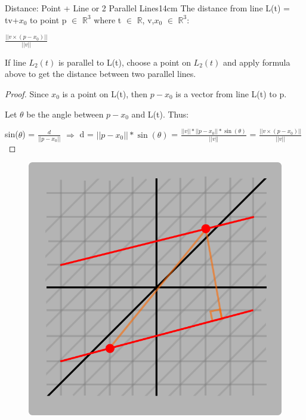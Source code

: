     \newpage



    \begin{wtheorem}{Distance: Point + Line or 2 Parallel Lines}{14cm}
        The distance from line L(t) = tv+$x_0$ to point p $\in$ $\mathbb{R}^3$
        where t $\in$ $\mathbb{R}$, v,$x_0$ $\in$ $\mathbb{R}^3$:

        \hspace{0.5cm}
        $\frac{||v \times (p - x_0)||}{||v||}$

        If line $L_2(t)$ is parallel to L(t), choose a point on $L_2(t)$
        and apply formula above to get the distance between two parallel lines.
    \end{wtheorem}

    \begin{proof}
        Since $x_0$ is a point on L(t), then
        $p - x_0$ is a vector from line L(t) to p.

        Let $\theta$ be the angle between $p - x_0$
        and L(t). Thus:

        \hspace{0.5cm}
        sin($\theta$) = $\frac{d}{||p - x_0||}$
        \hspace{0.5cm}
        $\Rightarrow$
        \hspace{0.5cm}
        d = $||p - x_0|| * \sin(\theta)$
        = $\frac{||v|| * ||p - x_0|| * \sin(\theta)}{||v||}$
        = $\frac{||v \times (p - x_0)||}{||v||}$
    \end{proof}

    \begin{figure}[h]
        \centering
        \includegraphics[scale=0.3]{Images/1.4.3.png}
    \end{figure}




